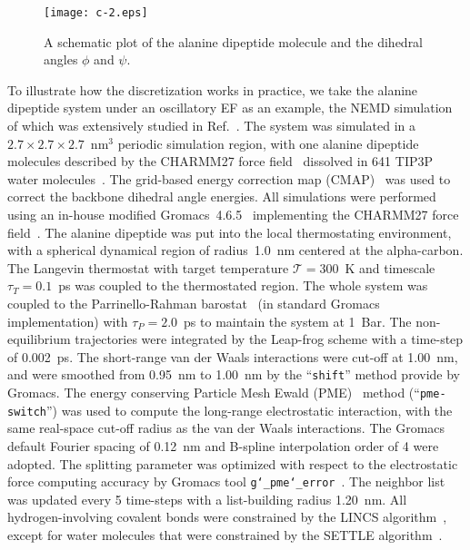 \documentclass[journal=jctcce,manuscript=article]{achemso}
\begin{document}
\begin{figure}
  \centering
  \texttt{[image: c-2.eps]}
  \caption{A schematic plot of the alanine dipeptide molecule and the dihedral angles $\phi$ and $\psi$.}
  \label{fig:tmp1}
\end{figure}


To illustrate how the discretization works in practice, we take the alanine dipeptide system under an oscillatory EF
as an example, the NEMD simulation of which was
extensively studied in Ref.~\cite{wang2014exploring}.
The system was simulated in a $2.7\times 2.7\times 2.7$~$\textrm{nm}^3$ periodic simulation
region, with one alanine dipeptide molecules described by the CHARMM27 force field~\cite{foloppe2000all} dissolved in 641 TIP3P water molecules~\cite{jorgensen1983comparison}.
The grid-based energy correction map (CMAP)~\cite{mackerell2004extending} was used
to correct the backbone dihedral angle energies.
All simulations were performed using an in-house modified
Gromacs~4.6.5~\cite{pronk2013gromacs} implementing the CHARMM27 force field~\cite{bjelkmar2010implementation}.
The alanine dipeptide was put into the local thermostating
environment, with a spherical dynamical region of radius~1.0~nm
centered at the alpha-carbon.
The Langevin thermostat with target temperature $\mathcal T = 300$~K
and timescale $\tau_T = 0.1$~ps was
coupled to the thermostated region.
The whole system was coupled to the Parrinello-Rahman barostat~\cite{parrinello1981polymorphic} (in standard Gromacs implementation) with $\tau_P = 2.0$~ps to
maintain the system at 1~Bar. The non-equilibrium trajectories
were integrated by the Leap-frog scheme with a time-step of 0.002~ps.
The short-range van der Waals interactions were cut-off at 1.00~nm, and were smoothed from
0.95~nm to 1.00~nm by the ``\texttt{shift}'' method provide by Gromacs.
The energy conserving 
Particle Mesh Ewald (PME)~\cite{darden1993pme, essmann1995spm} method (``\texttt{pme-switch}'') was
used to compute the long-range electrostatic interaction,
with the same real-space cut-off radius as the van der Waals interactions.
The Gromacs default Fourier spacing of 0.12~nm and B-spline interpolation order of 4 were adopted.
The splitting
parameter was optimized with respect to the electrostatic force computing
accuracy by Gromacs tool \texttt{g\char`_pme\char`_error}~\cite{wang2010optimizing}.
The neighbor list was updated every 5 time-steps with a list-building radius 1.20~nm.
All hydrogen-involving covalent bonds were constrained by the LINCS algorithm~\cite{hess1997lincs}, except for water molecules that were constrained by the SETTLE algorithm~\cite{miyamoto2004settle}.
\end{document}
